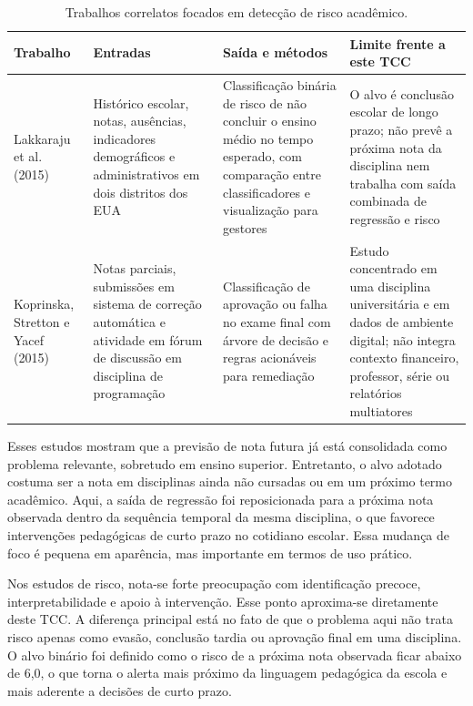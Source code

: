 \begin{table}[!htbp]
\caption{Trabalhos correlatos focados em detec\c{c}\~ao de risco acad\^emico.}
\label{tab:trab-rel-risco}
\centering
\footnotesize
\begin{tabularx}{\textwidth}{L{3.1cm} X X X}
\hline
\textbf{Trabalho} & \textbf{Entradas} & \textbf{Sa\'ida e m\'etodos} & \textbf{Limite frente a este TCC} \\
\hline
Lakkaraju et al. (2015) & Hist\'orico escolar, notas, aus\^encias, indicadores demogr\'aficos e administrativos em dois distritos dos EUA & Classifica\c{c}\~ao bin\'aria de risco de n\~ao concluir o ensino m\'edio no tempo esperado, com compara\c{c}\~ao entre classificadores e visualiza\c{c}\~ao para gestores & O alvo \'e conclus\~ao escolar de longo prazo; n\~ao prev\^e a pr\'oxima nota da disciplina nem trabalha com sa\'ida combinada de regress\~ao e risco \\
Koprinska, Stretton e Yacef (2015) & Notas parciais, submiss\~oes em sistema de corre\c{c}\~ao autom\'atica e atividade em f\'orum de discuss\~ao em disciplina de programa\c{c}\~ao & Classifica\c{c}\~ao de aprova\c{c}\~ao ou falha no exame final com \'arvore de decis\~ao e regras acion\'aveis para remedia\c{c}\~ao & Estudo concentrado em uma disciplina universit\'aria e em dados de ambiente digital; n\~ao integra contexto financeiro, professor, s\'erie ou relat\'orios multiatores \\
\hline
\end{tabularx}
\end{table}

\FloatBarrier

Esses estudos mostram que a previs\~ao de nota futura j\'a est\'a consolidada como problema relevante, sobretudo em ensino superior. Entretanto, o alvo adotado costuma ser a nota em disciplinas ainda n\~ao cursadas ou em um pr\'oximo termo acad\^emico. Aqui, a sa\'ida de regress\~ao foi reposicionada para a pr\'oxima nota observada dentro da sequ\^encia temporal da mesma disciplina, o que favorece interven\c{c}\~oes pedag\'ogicas de curto prazo no cotidiano escolar. Essa mudan\c{c}a de foco \'e pequena em apar\^encia, mas importante em termos de uso pr\'atico.

Nos estudos de risco, nota-se forte preocupa\c{c}\~ao com identifica\c{c}\~ao precoce, interpretabilidade e apoio \`a interven\c{c}\~ao. Esse ponto aproxima-se diretamente deste TCC. A diferen\c{c}a principal est\'a no fato de que o problema aqui n\~ao trata risco apenas como evas\~ao, conclus\~ao tardia ou aprova\c{c}\~ao final em uma disciplina. O alvo bin\'ario foi definido como o risco de a pr\'oxima nota observada ficar abaixo de 6,0, o que torna o alerta mais pr\'oximo da linguagem pedag\'ogica da escola e mais aderente a decis\~oes de curto prazo.

